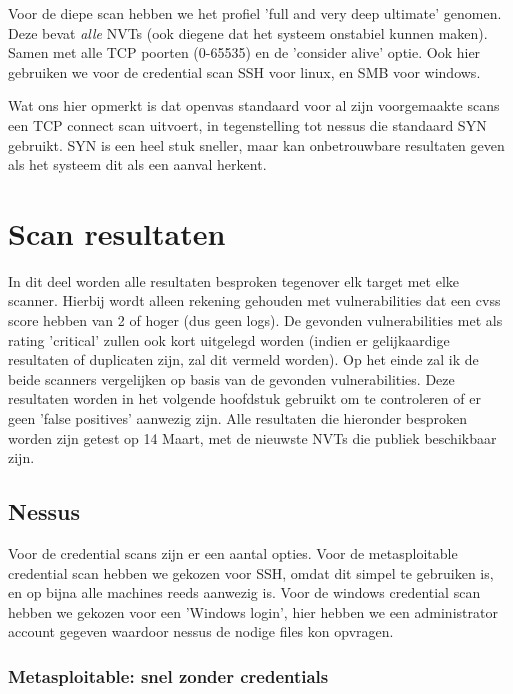 Voor de diepe scan hebben we het profiel 'full and very deep ultimate' genomen. Deze bevat \textit{alle} NVTs (ook diegene dat het systeem onstabiel kunnen maken). Samen met alle TCP poorten (0-65535) en de 'consider alive' optie. Ook hier gebruiken we voor de credential scan SSH voor linux, en SMB voor windows.

Wat ons hier opmerkt is dat openvas standaard voor al zijn voorgemaakte scans een TCP connect scan uitvoert, in tegenstelling tot nessus die standaard SYN gebruikt. SYN is een heel stuk sneller, maar kan onbetrouwbare resultaten geven als het systeem dit als een aanval herkent.


\section{Scan resultaten}

In dit deel worden alle resultaten besproken tegenover elk target met elke scanner. Hierbij wordt alleen rekening gehouden met vulnerabilities dat een cvss score hebben van 2 of hoger (dus geen logs). De gevonden vulnerabilities met als rating 'critical' zullen ook kort uitgelegd worden (indien er gelijkaardige resultaten of duplicaten zijn, zal dit vermeld worden). Op het einde zal ik de beide scanners vergelijken op basis van de gevonden vulnerabilities. Deze resultaten worden in het volgende hoofdstuk gebruikt om te controleren of er geen 'false positives' aanwezig zijn. Alle resultaten die hieronder besproken worden zijn getest op 14 Maart, met de nieuwste NVTs die publiek beschikbaar zijn.

\subsection{Nessus}

Voor de credential scans zijn er een aantal opties. Voor de metasploitable credential scan hebben we gekozen voor SSH, omdat dit simpel te gebruiken is, en op bijna alle machines reeds aanwezig is. Voor de windows credential scan hebben we gekozen voor een 'Windows login', hier hebben we een administrator account gegeven waardoor nessus de nodige files kon opvragen.

\subsubsection{Metasploitable: snel zonder credentials}


